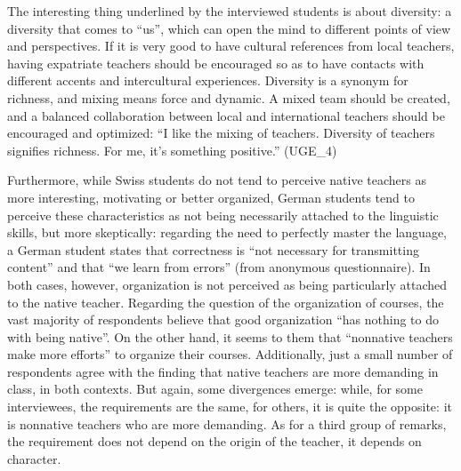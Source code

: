 \documentclass[output=paper]{../langscibook}
\begin{document}
The interesting thing underlined by the interviewed students is about diversity: a diversity that comes to “us”, which can open the mind to different points of view and perspectives. If it is very good to have cultural references from local teachers, having expatriate teachers should be encouraged so as to have contacts with different accents and intercultural experiences. Diversity is a synonym for richness, and mixing means force and dynamic. A mixed team should be created, and a balanced collaboration between local and international teachers should be encouraged and optimized: “I like the mixing of teachers. Diversity of teachers signifies richness. For me, it’s something positive.” (UGE\_4) 

Furthermore, while Swiss students do not tend to perceive native teachers as more interesting, motivating or better organized, German students tend to perceive these characteristics as not being necessarily attached to the linguistic skills, but more skeptically: regarding the need to perfectly master the language, a German student states that correctness is “not necessary for transmitting content” and that “we learn from errors” (from anonymous questionnaire).  In both cases, however, organization is not perceived as being particularly attached to the native teacher. Regarding the question of the organization of courses, the vast majority of respondents believe that good organization “has nothing to do with being native”. On the other hand, it seems to them that “nonnative teachers make more efforts” to organize their courses. Additionally, just a small number of respondents agree with the finding that native teachers are more demanding in class, in both contexts. But again, some divergences emerge: while, for some interviewees, the requirements are the same, for others, it is quite the opposite: it is nonnative teachers who are more demanding. As for a third group of remarks, the requirement does not depend on the origin of the teacher, it depends on character.
\end{document}
